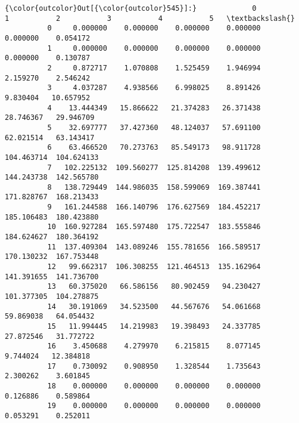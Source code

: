 \documentclass[11pt]{article}
\begin{document}
\begin{Verbatim}[commandchars=\\\{\}]
{\color{outcolor}Out[{\color{outcolor}545}]:}             0           1           2           3           4           5   \textbackslash{}
          0     0.000000    0.000000    0.000000    0.000000    0.000000    0.054172   
          1     0.000000    0.000000    0.000000    0.000000    0.000000    0.130787   
          2     0.872717    1.070808    1.525459    1.946994    2.159270    2.546242   
          3     4.037287    4.938566    6.998025    8.891426    9.830404   10.657952   
          4    13.444349   15.866622   21.374283   26.371438   28.746367   29.946709   
          5    32.697777   37.427360   48.124037   57.691100   62.021514   63.143417   
          6    63.466520   70.273763   85.549173   98.911728  104.463714  104.624133   
          7   102.225132  109.560277  125.814208  139.499612  144.243738  142.565780   
          8   138.729449  144.986035  158.599069  169.387441  171.828767  168.213433   
          9   161.244588  166.140796  176.627569  184.452217  185.106483  180.423880   
          10  160.927284  165.597480  175.722547  183.555846  184.624627  180.364192   
          11  137.409304  143.089246  155.781656  166.589517  170.130232  167.753448   
          12   99.662317  106.308255  121.464513  135.162964  141.391655  141.736700   
          13   60.375020   66.586156   80.902459   94.230427  101.377305  104.278875   
          14   30.191069   34.523500   44.567676   54.061668   59.869038   64.054432   
          15   11.994445   14.219983   19.398493   24.337785   27.872546   31.772722   
          16    3.450688    4.279970    6.215815    8.077145    9.744024   12.384818   
          17    0.730092    0.908950    1.328544    1.735643    2.300262    3.601845   
          18    0.000000    0.000000    0.000000    0.000000    0.126886    0.589864   
          19    0.000000    0.000000    0.000000    0.000000    0.053291    0.252011   
          

\end{Verbatim}
\end{document}
